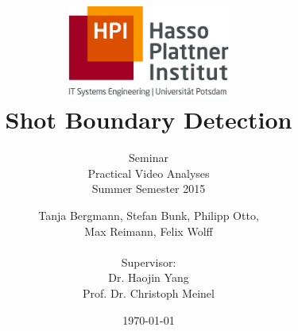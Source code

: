 \documentclass[a4paper,12pt,headsepline,pagesize,bibtotoc,titlepage]{scrartcl}
\title{
	\includegraphics*[width=0.4\textwidth]{images/hpi_logo.png}\\
	\vspace{24pt}
	Shot Boundary Detection
}
\subtitle{
	Seminar\\
	Practical Video Analyses\\
	Summer Semester 2015
}
\author{
	Tanja Bergmann, Stefan Bunk, Philipp Otto, \\
	Max Reimann, Felix Wolff\\ \\[12pt]
	Supervisor:\\
	Dr. Haojin Yang\\
	Prof. Dr. Christoph Meinel
}
\date{\today}
\begin{document}
\maketitle
\tableofcontents
\newpage








{}

\end{document}
